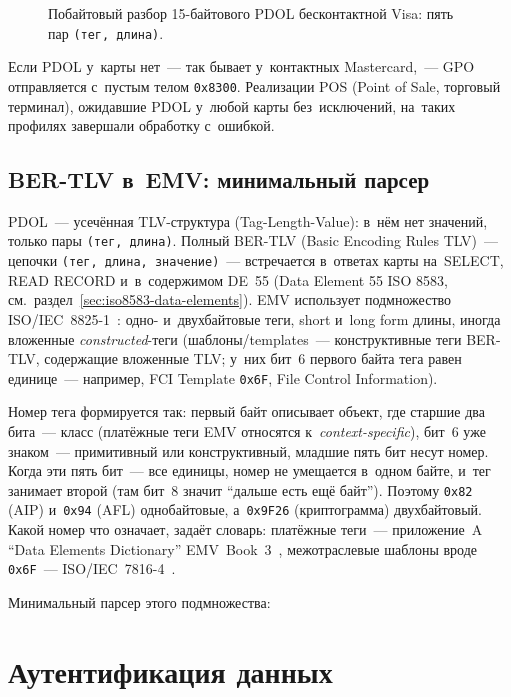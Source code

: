 \begin{figure}[tbp]
  \centering
  \caption{Побайтовый разбор 15-байтового PDOL бесконтактной Visa: пять пар \mbox{\texttt{(тег, длина)}}.}\label{fig:pdol-anatomy}
\end{figure}

Если PDOL у~карты нет~--- так бывает у~контактных Mastercard,~--- GPO
отправляется с~пустым телом \texttt{0x8300}. Реализации POS (Point of Sale,
торговый терминал), ожидавшие PDOL у~любой карты без~исключений, на~таких
профилях завершали обработку с~ошибкой.

\subsection*{BER-TLV в~EMV: минимальный парсер}

PDOL~--- усечённая TLV-структура (Tag-Length-Value): в~нём нет значений, только пары \texttt{(тег, длина)}. Полный
BER-TLV (Basic Encoding Rules TLV)~--- цепочки \texttt{(тег, длина,
значение)}~--- встречается в~ответах карты на~SELECT, READ RECORD
и~в~содержимом DE~55 (Data Element 55 ISO 8583,
см.~раздел~\ref{sec:iso8583-data-elements}). EMV использует подмножество
ISO/IEC~8825-1~\cite{iso-8825-1}: одно- и~двухбайтовые теги, short и~long form
длины, иногда вложенные \emph{constructed}-теги (шаблоны/templates~--- конструктивные
  теги BER-TLV, содержащие вложенные TLV; у~них бит~6 первого байта тега равен
единице~--- например, FCI Template \texttt{0x6F}, File Control Information).

Номер тега формируется так: первый байт описывает объект, где старшие два
бита~--- класс (платёжные теги EMV относятся к~\textit{context-specific}),
бит~6 уже знаком~--- примитивный или конструктивный, младшие пять
бит несут номер. Когда эти пять бит~--- все единицы, номер не умещается
в~одном байте, и~тег занимает второй (там бит~8 значит \enquote{дальше есть
ещё байт}). Поэтому \texttt{0x82} (AIP) и~\texttt{0x94} (AFL) однобайтовые,
а~\texttt{0x9F26} (криптограмма) двухбайтовый. Какой номер что означает,
задаёт словарь: платёжные теги~--- приложение~A \enquote{Data Elements
Dictionary} EMV~Book~3~\cite{emvco-book3}, межотраслевые шаблоны вроде
\texttt{0x6F}~--- ISO/IEC~7816-4~\cite{iso-7816-4}.

Минимальный парсер этого подмножества:


\section{Аутентификация данных}\label{sec:emv-data-auth}

